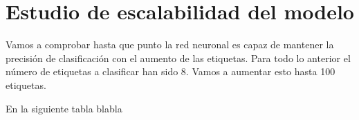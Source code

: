 \subsubsection{}


\section{Estudio de escalabilidad del modelo}

Vamos a comprobar hasta que punto la red neuronal es capaz de mantener la precisión de clasificación con el aumento de las etiquetas. Para todo lo anterior el número de etiquetas a clasificar han sido 8. Vamos a aumentar esto hasta 100 etiquetas.

En la siguiente tabla blabla